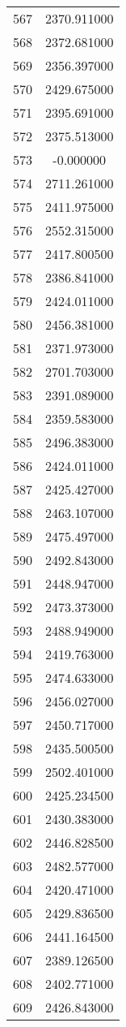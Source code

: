\documentclass[12pt]{article}
\begin{document}
\begin{longtable}{@{}cc@{}}
567 & 2370.911000 \\
568 & 2372.681000 \\
569 & 2356.397000 \\
570 & 2429.675000 \\
571 & 2395.691000 \\
572 & 2375.513000 \\
573 & -0.000000 \\
574 & 2711.261000 \\
575 & 2411.975000 \\
576 & 2552.315000 \\
577 & 2417.800500 \\
578 & 2386.841000 \\
579 & 2424.011000 \\
580 & 2456.381000 \\
581 & 2371.973000 \\
582 & 2701.703000 \\
583 & 2391.089000 \\
584 & 2359.583000 \\
585 & 2496.383000 \\
586 & 2424.011000 \\
587 & 2425.427000 \\
588 & 2463.107000 \\
589 & 2475.497000 \\
590 & 2492.843000 \\
591 & 2448.947000 \\
592 & 2473.373000 \\
593 & 2488.949000 \\
594 & 2419.763000 \\
595 & 2474.633000 \\
596 & 2456.027000 \\
597 & 2450.717000 \\
598 & 2435.500500 \\
599 & 2502.401000 \\
600 & 2425.234500 \\
601 & 2430.383000 \\
602 & 2446.828500 \\
603 & 2482.577000 \\
604 & 2420.471000 \\
605 & 2429.836500 \\
606 & 2441.164500 \\
607 & 2389.126500 \\
608 & 2402.771000 \\
609 & 2426.843000 \\

\end{longtable}
\end{document}
